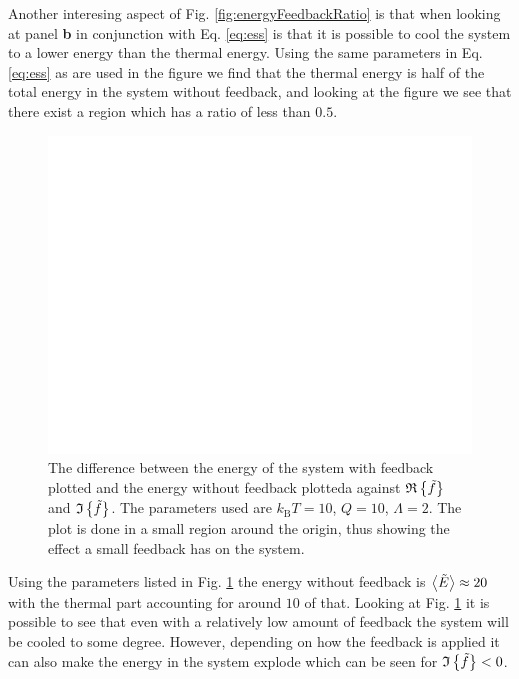 Another interesing aspect of Fig. \ref{fig:energyFeedbackRatio} is that when looking at panel \textbf{b} in conjunction with Eq. \eqref{eq:ess} is that it is possible to cool the system to a lower energy than the thermal energy. Using the same parameters in Eq. \eqref{eq:ess} as are used in the figure we find that the thermal energy is half of the total energy in the system without feedback, and looking at the figure we see that there exist a region which has a ratio of less than $0.5$.


\begin{figure}
    \centering
    \includegraphics[width=\textwidth]{figures/energyFeedbackDifference.pdf}
    \caption{\small The difference between the energy of the system with feedback plotted and the energy without feedback plotteda against $\mathfrak{R}\left\{\tilde{f}\right\}$ and $\mathfrak{I}\left\{\tilde{f}\right\}$. The parameters used are $k_\text{B}T = 10$, $Q = 10$, $\Lambda = 2$. The plot is done in a small region around the origin, thus showing the effect a small feedback has on the system. }
    \label{fig:energyFeedbackDifference}
\end{figure}

Using the parameters listed in Fig. \ref{fig:energyFeedbackDifference} the energy without feedback is $\expval{\tilde{E}} \approx 20$ with the thermal part accounting for around $10$ of that. Looking at Fig. \ref{fig:energyFeedbackDifference} it is possible to see that even with a relatively low amount of feedback the system will be cooled to some degree. However, depending on how the feedback is applied it can also make the energy in the system explode which can be seen for $\mathfrak{I}\left\{\tilde{f}\right\} < 0$.


